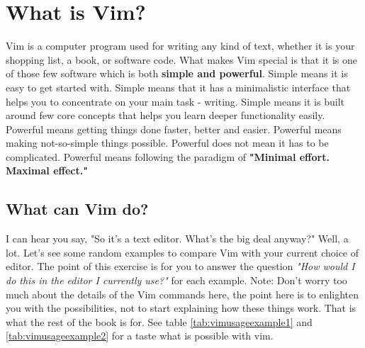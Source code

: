 \section{What is Vim?} 
Vim is a computer program used for writing any kind of text, whether it is your
shopping list, a book, or software code. What makes Vim special is that it is
one of those few software which is both \textbf{simple and powerful}. Simple means
it is easy to get started with. Simple means that it
has a minimalistic interface that helps you to concentrate on your main task -
writing. Simple means it is built around few core concepts that helps you learn
deeper functionality easily. Powerful means getting things done faster, better
and easier. Powerful means making not-so-simple things possible. Powerful does
not mean it has to be complicated. Powerful means following the paradigm of
\textbf{"Minimal effort. Maximal effect."} 

\subsection{What can Vim do?} 
I can hear you say, "So it's a text editor. What's the big deal anyway?" Well,
a lot. Let's see some random examples to compare Vim with your current choice
of editor. The point of this exercise is for you to answer the question \textit{"How
would I do this in the editor I currently use?"} for each example. Note:
Don't worry too much about the details of the Vim commands here, the point here
is to enlighten you with the possibilities, not to start explaining how these
things work. That is what the rest of the book is for. See table
\ref{tab:vimusageexample1} and \ref{tab:vimusageexample2} for a taste what is
possible with vim.

